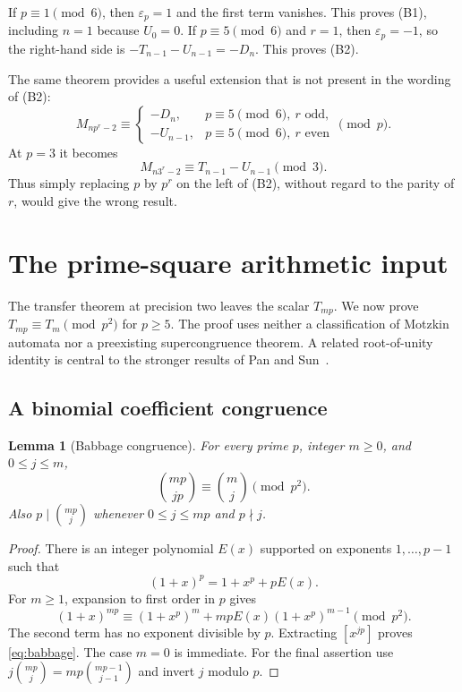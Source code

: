 \documentclass[11pt,a4paper]{article}
\numberwithin{equation}{section}
\newtheorem{lemma}[theorem]{Lemma}
\theoremstyle{definition}
\theoremstyle{remark}
\newcommand{\eps}{\varepsilon}
\begin{document}
If $p\equiv1\pmod6$, then $\eps_p=1$ and the first term vanishes.
This proves (B1), including $n=1$ because $U_0=0$.
If $p\equiv5\pmod6$ and $r=1$, then $\eps_p=-1$, so the right-hand
side is $-T_{n-1}-U_{n-1}=-D_n$. This proves (B2).

The same theorem provides a useful extension that is not present in the
wording of (B2):
\begin{equation}\label{eq:alternation}
 M_{np^r-2}\equiv
 \begin{cases}
 -D_n,&p\equiv5\pmod6,\ r\text{ odd},\\
 -U_{n-1},&p\equiv5\pmod6,\ r\text{ even}
 \end{cases}
 \pmod p.
\end{equation}
At $p=3$ it becomes
\begin{equation}\label{eq:p3boundary}
 M_{n3^r-2}\equiv T_{n-1}-U_{n-1}\pmod3.
\end{equation}
Thus simply replacing $p$ by $p^r$ on the left of (B2), without regard
to the parity of $r$, would give the wrong result.

\section{The prime-square arithmetic input}\label{sec:squareinput}

The transfer theorem at precision two leaves the scalar $T_{mp}$.
We now prove $T_{mp}\equiv T_m\pmod{p^2}$ for $p\geq5$. The proof
uses neither a classification of Motzkin automata nor a preexisting
supercongruence theorem. A related root-of-unity identity is central to
the stronger results of Pan and Sun~\cite{panSun}.

\subsection{A binomial coefficient congruence}
\begin{lemma}[Babbage congruence]\label{lem:babbage}
For every prime $p$, integer $m\geq0$, and $0\leq j\leq m$,
\begin{equation}\label{eq:babbage}
 \binom{mp}{jp}\equiv\binom mj\pmod{p^2}.
\end{equation}
Also $p\mid\binom{mp}{j}$ whenever $0\leq j\leq mp$ and $p\nmid j$.
\end{lemma}
\begin{proof}
There is an integer polynomial $E(x)$ supported on exponents
$1,\ldots,p-1$ such that
\[
 (1+x)^p=1+x^p+pE(x).
\]
For $m\geq1$, expansion to first order in $p$ gives
\[
 (1+x)^{mp}\equiv(1+x^p)^m+mpE(x)(1+x^p)^{m-1}\pmod{p^2}.
\]
The second term has no exponent divisible by $p$. Extracting $[x^{jp}]$
proves \eqref{eq:babbage}. The case $m=0$ is immediate.
For the final assertion use
$j\binom{mp}{j}=mp\binom{mp-1}{j-1}$ and invert $j$ modulo $p$.
\end{proof}
\end{document}
